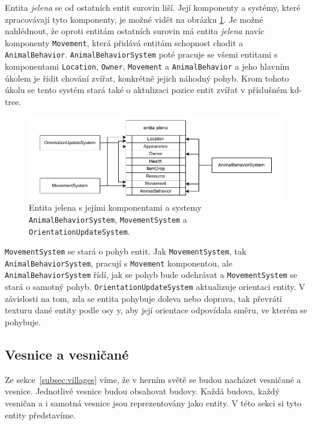 Entita \textit{jelena} se od ostatních entit surovin liší. Její komponenty a systémy, které zpracovávají tyto komponenty, je možné vidět na obrázku \ref{fig:deer}. Je možné nahlédnout, že oproti entitám ostatních surovin má entita \textit{jelena} navíc komponenty \texttt{Movement}, která přidává entitám schopnost chodit a \texttt{AnimalBehavior}. \texttt{AnimalBehaviorSystem} poté pracuje se všemi entitami s komponentami \texttt{Location}, \texttt{Owner}, \texttt{Movement} a \texttt{AnimalBehavior} a jeho hlavním úkolem je řídit chování zvířat, konkrétně jejich náhodný pohyb. Krom tohoto úkolu se tento systém stará také o aktulizaci pozice entit zvířat v příslušném kd-tree.

\begin{figure}[!htb]
  \centering
  \includegraphics[width=1.0\linewidth]{img/deer.pdf}
  \caption{Entita jelena s jejími komponentami a systemy \texttt{AnimalBehaviorSystem}, \texttt{MovementSystem} a \texttt{OrientationUpdateSystem}.}
  \label{fig:deer}
\end{figure}

\texttt{MovementSystem} se stará o pohyb entit. Jak \texttt{MovementSystem}, tak \texttt{AnimalBehaviorSystem}, pracují s \texttt{Movement} komponentou, ale \texttt{AnimalBehaviorSystem} řídí, jak se pohyb bude odehrávat a \texttt{MovementSystem} se stará o samotný pohyb. \texttt{OrientationUpdateSystem} aktualizuje orientaci entity. V závislosti na tom, zda se entita pohybuje doleva nebo doprava, tak převrátí texturu dané entity podle osy y, aby její orientace odpovídala směru, ve kterém se pohybuje.

\subsection{Vesnice a vesničané}
Ze sekce~\ref{subsec:villages} víme, že v herním světě se budou nacházet vesničané a vesnice. Jednotlivé vesnice budou obsahovat budovy. Každá budova, každý vesničan a i samotná vesnice jsou reprezentovány jako entity. V této sekci si tyto entity představíme.

